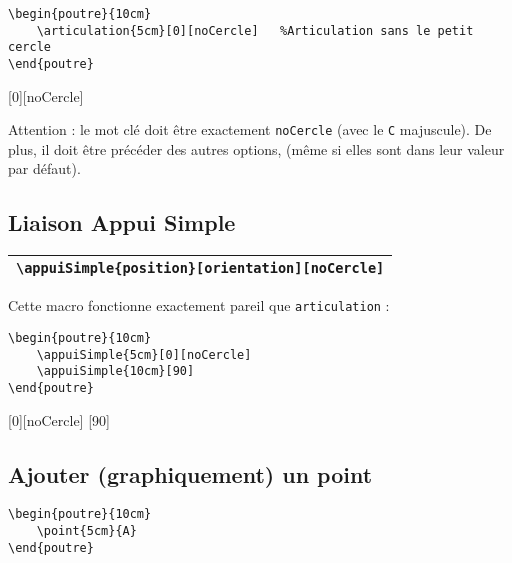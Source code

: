 \documentclass[a4paper,10pt]{article}
\begin{document}
        \begin{verbatim}
\begin{poutre}{10cm}
    \articulation{5cm}[0][noCercle]   %Articulation sans le petit cercle
\end{poutre}
        \end{verbatim}

\begin{poutre}{10cm}
    \articulation{5cm}[0][noCercle]   %
\end{poutre}

    Attention : le mot clé doit être exactement \verb!noCercle! (avec le \verb!C! majuscule). De plus, il doit être précéder des autres options, (même si elles sont dans leur valeur par défaut).
	

	
  
    \subsection{Liaison Appui Simple}
	
	\begin{center}
        \begin{tabular}{|c|}
            \hline
            \verb!\appuiSimple{position}[orientation][noCercle]!
            \\\hline
        \end{tabular}
    \end{center}
	
        Cette macro fonctionne exactement pareil que \verb!articulation! :
	
        \begin{verbatim}
\begin{poutre}{10cm}
    \appuiSimple{5cm}[0][noCercle]
    \appuiSimple{10cm}[90]
\end{poutre}
        \end{verbatim}

\begin{poutre}{10cm}
    \appuiSimple{5cm}[0][noCercle]
    \appuiSimple{10cm}[90]
\end{poutre}
	
	
    \subsection{Ajouter (graphiquement) un point}
	
           \begin{verbatim}
\begin{poutre}{10cm}
    \point{5cm}{A}
\end{poutre}
        \end{verbatim}
	
\end{document}
